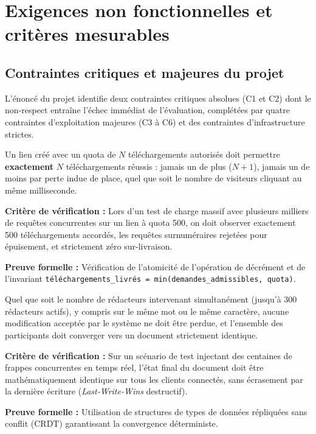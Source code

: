 \chapter{Exigences non fonctionnelles et critères mesurables}

\section{Contraintes critiques et majeures du projet}

L'énoncé du projet identifie deux contraintes critiques absolues (C1 et C2) dont le non-respect entraîne l'échec immédiat de l'évaluation, complétées par quatre contraintes d'exploitation majeures (C3 à C6) et des contraintes d'infrastructure strictes.

\begin{criticalbox}
Un lien créé avec un quota de $N$ téléchargements autorisés doit permettre \textbf{exactement} $N$ téléchargements réussis : jamais un de plus ($N+1$), jamais un de moins par perte indue de place, quel que soit le nombre de visiteurs cliquant au même milliseconde.

\smallskip
\textbf{Critère de vérification :} Lors d'un test de charge massif avec plusieurs milliers de requêtes concurrentes sur un lien à quota 500, on doit observer exactement 500 téléchargements accordés, les requêtes surnuméraires rejetées pour épuisement, et strictement zéro sur-livraison.

\smallskip
\textbf{Preuve formelle :} Vérification de l'atomicité de l'opération de décrément et de l'invariant \texttt{téléchargements\_livrés = min(demandes\_admissibles, quota)}.
\end{criticalbox}

\begin{criticalbox}
Quel que soit le nombre de rédacteurs intervenant simultanément (jusqu'à 300 rédacteurs actifs), y compris sur le même mot ou le même caractère, aucune modification acceptée par le système ne doit être perdue, et l'ensemble des participants doit converger vers un document strictement identique.

\smallskip
\textbf{Critère de vérification :} Sur un scénario de test injectant des centaines de frappes concurrentes en temps réel, l'état final du document doit être mathématiquement identique sur tous les clients connectés, sans écrasement par la dernière écriture (\emph{Last-Write-Wins} destructif).

\smallskip
\textbf{Preuve formelle :} Utilisation de structures de types de données répliquées sans conflit (CRDT) garantissant la convergence déterministe.
\end{criticalbox}

